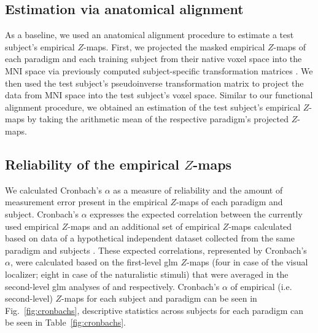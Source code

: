 \subsection{Estimation via anatomical alignment}
%
As a baseline, we used an anatomical alignment procedure to estimate a test
subject's empirical $Z$-maps.
%
First, we projected the masked empirical $Z$-maps of each paradigm and each
training subject from their native voxel space into the MNI space via previously
computed subject-specific transformation matrices
\citep[][\href{https://github.com/psychoinformatics-de/studyforrest-data-templatetransforms}{\url{github.com/psychoinformatics-de/studyforrest-data-templatetransforms}}]{hanke2014audiomovie}.
We then used the test subject's pseudoinverse transformation matrix to project
the data from MNI space into the test subject's voxel space.
Similar to our functional alignment procedure, we obtained an estimation of the
test subject's empirical $Z$-maps by taking the arithmetic mean of the
respective paradigm's projected $Z$-maps.



\subsection{Reliability of the empirical $Z$-maps}
%
We calculated Cronbach's $\alpha$ as a measure of reliability and the amount of
measurement error \citep{cronbach1951coefficient, cortina1993coefficient}
present in the empirical $Z$-maps of each paradigm and subject.
%
Cronbach's $\alpha$ expresses the expected correlation between the currently
used empirical $Z$-maps and an additional set of empirical $Z$-maps calculated
based on data of a hypothetical independent dataset collected from the same
paradigm and subjects \citep{jiahui2020predicting, jiahui2022cross}.
%
These expected correlations, represented by Cronbach's $\alpha$, were calculated
based on the first-level \ac{glm} $Z$-maps (four in case of the visual
localizer; eight in case of the naturalistic stimuli) that were averaged in the
second-level \ac{glm} analyses of \citet{sengupta2016extension} and
\citet{haeusler2022processing} respectively.
%
Cronbach's $\alpha$ of empirical (i.e. second-level) $Z$-maps for each subject
and paradigm can be seen in Fig.~\ref{fig:cronbachs}, descriptive statistics
across subjects for each paradigm can be seen in Table~\ref{fig:cronbachs}.


